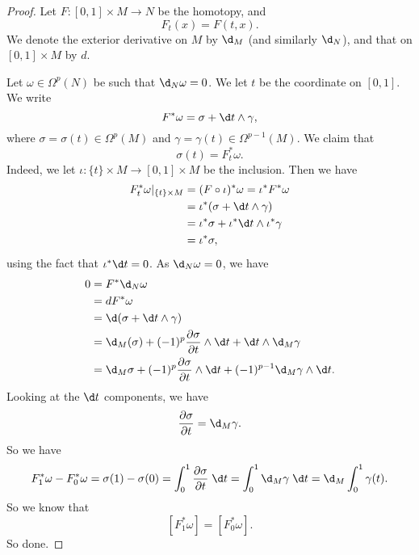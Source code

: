 \documentclass[a4paper]{article}
\begin{document}
\begin{proof}
  Let $F: [0, 1] \times M \to N$ be the homotopy, and
  \[
    F_t(x) = F(t, x).
  \]
  We denote the exterior derivative on $M$ by $\d_M$ (and similarly $\d_N$), and that on $[0, 1] \times M$ by $d$.

  Let $\omega \in \Omega^p(N)$ be such that $\d_N \omega = 0$. We let $t$ be the coordinate on $[0, 1]$. We write
  \[
    F^* \omega = \sigma + \d t \wedge \gamma,
  \]
  where $\sigma = \sigma(t) \in \Omega^p(M)$ and $\gamma = \gamma(t) \in \Omega^{p - 1}(M)$. We claim that
  \[
    \sigma(t) = F_t^* \omega.
  \]
  Indeed, we let $\iota: \{t\} \times M \to [0, 1] \times M$ be the inclusion. Then we have
  \begin{align*}
    F_t^* \omega |_{\{t\} \times M} &= (F \circ \iota)^* \omega = \iota^* F^* \omega \\
    &= \iota^* (\sigma + \d t \wedge \gamma)\\
    &= \iota^* \sigma + \iota^* \d t \wedge \iota^* \gamma\\
    &= \iota^* \sigma,
  \end{align*}
  using the fact that $\iota^* \d t = 0$. As $\d_N \omega = 0$, we have
  \begin{align*}
    0 &= F^* \d_N \omega \\
    &= d F^* \omega \\
    &= \d(\sigma + \d t \wedge \gamma)\\
    &= \d_M(\sigma) + (-1)^p\frac{\partial \sigma}{\partial t} \wedge \d t + \d t \wedge \d_M \gamma\\
    &= \d_M \sigma + (-1)^p \frac{\partial \sigma}{\partial t} \wedge \d t + (-1)^{p - 1} \d_M \gamma \wedge \d t.
  \end{align*}
  Looking at the $\d t$ components, we have
  \[
    \frac{\partial \sigma}{\partial t} = \d_M \gamma.
  \]
  So we have
  \[
    F_1^* \omega - F_0^* \omega = \sigma(1) - \sigma(0) = \int_0^1 \frac{\partial \sigma}{\partial t} \;\d t = \int_0^1 \d_M \gamma \;\d t = \d_M \int_0^1 \gamma(t).
  \]
  So we know that
  \[
    [F_1^* \omega] = [F_0^* \omega].
  \]
  So done.
\end{proof}
\end{document}
